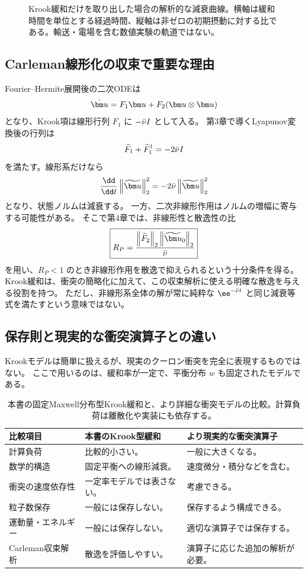 \begin{figure}[htbp]
\centering

\caption{Krook緩和だけを取り出した場合の解析的な減衰曲線。横軸は緩和時間を単位とする経過時間、縦軸は非ゼロの初期摂動に対する比である。輸送・電場を含む数値実験の軌道ではない。}
\label{fig:krook-relaxation}
\end{figure}

\subsection{Carleman線形化の収束で重要な理由}
Fourier--Hermite展開後の二次ODEは
\[
\dot\uu=F_1\uu+F_2(\uu\otimes\uu)
\]
となり、Krook項は線形行列 $F_1$ に $-\bar\nu I$ として入る。
第3章で導くLyapunov変換後の行列は
\[
\widetilde F_1+\widetilde F_1^\dagger=-2\bar\nu I
\]
を満たす。線形系だけなら
\[
\frac{\dd}{\dd t}\normtwo{\tu}^2=-2\nuu\normtwo{\tu}^2
\]
となり、状態ノルムは減衰する。
一方、二次非線形作用はノルムの増幅に寄与する可能性がある。
そこで第4章では、非線形性と散逸性の比
\[
\boxed{R_P=\frac{\normtwo{\widetilde F_2}\normtwo{\tu_0}}{\nuu}}
\]
を用い、$R_P<1$ のとき非線形作用を散逸で抑えられるという十分条件を得る。
Krook緩和は、衝突の簡略化に加えて、この収束解析に使える明確な散逸を与える役割を持つ。
ただし、非線形系全体の解が常に純粋な $\ee^{-\nuu t}$ と同じ減衰等式を満たすという意味ではない。

\subsection{保存則と現実的な衝突演算子との違い}
Krookモデルは簡単に扱えるが、現実のクーロン衝突を完全に表現するものではない。
ここで用いるのは、緩和率が一定で、平衡分布 $w$ も固定されたモデルである。

\begin{table}[htbp]
\centering\small
\caption{本書の固定Maxwell分布型Krook緩和と、より詳細な衝突モデルの比較。計算負荷は離散化や実装にも依存する。}
\begin{tabularx}{\textwidth}{lXX}
\toprule 比較項目 & 本書のKrook型緩和 & より現実的な衝突演算子 \\\midrule
計算負荷 & 比較的小さい。 & 一般に大きくなる。\\
数学的構造 & 固定平衡への線形減衰。 & 速度微分・積分などを含む。\\
衝突の速度依存性 & 一定率モデルでは表さない。 & 考慮できる。\\
粒子数保存 & 一般には保存しない。 & 保存するよう構成できる。\\
運動量・エネルギー & 一般には保存しない。 & 適切な演算子では保存する。\\
Carleman収束解析 & 散逸を評価しやすい。 & 演算子に応じた追加の解析が必要。\\
\bottomrule
\end{tabularx}
\end{table}

